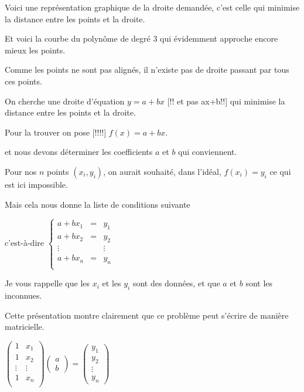 \diapo


Voici une représentation graphique de la droite demandée, c'est celle qui minimise la distance entre les points et la droite.


\change

Et voici la courbe du polynôme de degré $3$ qui évidemment approche encore mieux les points.
 
\diapo
  
\change
Comme les points ne sont pas alignés, il n'existe 
  pas de droite passant par tous ces points.
  
\change  
  On cherche une droite d'équation $y = a +bx$ [!! et pas ax+b!!] qui minimise la distance
  entre les points et la droite.
  
\change
Pour la trouver on pose [!!!!] $f(x) = a + bx$. 

et nous devons déterminer les coefficients $a$ et $b$ qui conviennent. 


\change
Pour nos $n$ points $(x_i,y_i)$, on aurait souhaité, dans l'idéal, $f(x_i)=y_i$ ce qui est ici impossible. 

\change
Mais cela nous donne la liste de conditions suivante 

\change
c'est-à-dire 
  $
  \left\{ 
  \begin{array}{rcl}
  a +b x_1 &=& y_1 \\
  a +b x_2 &=& y_2 \\
  \vdots && \vdots\\
  a +b x_n &=& y_n \\
  \end{array}
  \right.$

Je vous rappelle que les $x_i$ et les $y_i$ sont des données, et que
$a$ et $b$ sont les inconnues.

\change
Cette présentation montre clairement que ce problème peut s'écrire de manière matricielle.

$
  \begin{pmatrix}
  1 & x_1 \\
  1 & x_2 \\
  \vdots & \vdots \\
  1 & x_n \\  
  \end{pmatrix}
  \begin{pmatrix}
  a \\ b  
  \end{pmatrix}
  = 
  \begin{pmatrix}
  y_1\\
  y_2 \\
  \vdots \\
  y_n
  \end{pmatrix}
  $
  
